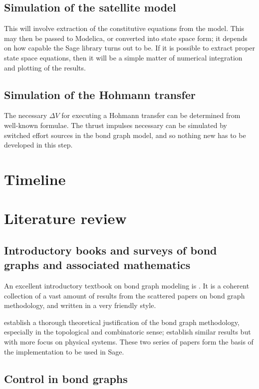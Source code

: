 \documentclass[utf8,a4paper,12pt]{report}
\begin{document}
\section{Simulation of the satellite model}
This will involve extraction of the constitutive equations from the model. This may then be passed to Modelica, or converted into state space form; it depends on how capable the Sage library turns out to be. If it is possible to extract proper state space equations, then it will be a simple matter of numerical integration and plotting of the results.

\section{Simulation of the Hohmann transfer}
The necessary $\Delta V$ for executing a Hohmann transfer can be determined from well-known formulae. The thrust impulses necessary can be simulated by switched effort sources in the bond graph model, and so nothing new has to be developed in this step.

\chapter{Timeline}

\chapter{Literature review}
\section{Introductory books and surveys of bond graphs and associated mathematics}
An excellent introductory textbook on bond graph modeling is \cite{Borutzky2010}. It is a coherent collection of a vast amount of results from the scattered papers on bond graph methodology, and written in a very friendly style.

\cite{Birkett1989,Birkett1989a,Birkett1990,Birkett1990a,Birkett2002,Birkett2002a} establish a thorough theoretical justification of the bond graph methodology, especially in the topological and combinatoric sense; \cite{Lamb1997b,Lamb1997,Lamb1997a} establish similar results but with more focus on physical systems. These two series of papers form the basis of the implementation to be used in Sage.
\section{Control in bond graphs}
\end{document}
